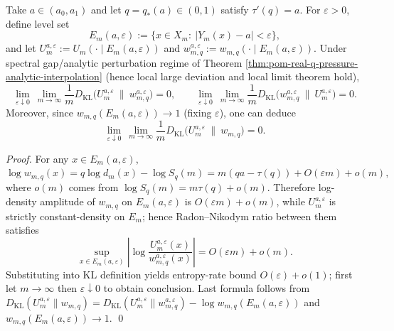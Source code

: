 \begin{theorem}\label{thm:pom-microcanonical-escort-kl-rate-zero}
Take \(a\in(a_0,a_1)\) and let \(q=q_*(a)\in(0,1)\) satisfy \(\tau'(q)=a\).
For \(\varepsilon>0\), define level set
\[
E_m(a,\varepsilon):=\{x\in X_m:\ |Y_m(x)-a|<\varepsilon\},
\]
and let
\(
U_m^{a,\varepsilon}:=U_m(\cdot\mid E_m(a,\varepsilon))
\)
and
\(
w_{m,q}^{a,\varepsilon}:=w_{m,q}(\cdot\mid E_m(a,\varepsilon))
\).
Under spectral gap/analytic perturbation regime of Theorem \ref{thm:pom-real-q-pressure-analytic-interpolation} (hence local large deviation and local limit theorem hold),
\[
\lim_{\varepsilon\downarrow 0}\ \lim_{m\to\infty}\frac{1}{m}D_{\mathrm{KL}}\!\bigl(U_m^{a,\varepsilon}\ \|\ w_{m,q}^{a,\varepsilon}\bigr)=0,
\qquad
\lim_{\varepsilon\downarrow 0}\ \lim_{m\to\infty}\frac{1}{m}D_{\mathrm{KL}}\!\bigl(w_{m,q}^{a,\varepsilon}\ \|\ U_m^{a,\varepsilon}\bigr)=0.
\]
Moreover, since \(w_{m,q}(E_m(a,\varepsilon))\to 1\) (fixing \(\varepsilon\)), one can deduce
\[
\lim_{\varepsilon\downarrow 0}\ \lim_{m\to\infty}\frac{1}{m}D_{\mathrm{KL}}\!\bigl(U_m^{a,\varepsilon}\ \|\ w_{m,q}\bigr)=0.
\]
\end{theorem}
\begin{proof}
For any \(x\in E_m(a,\varepsilon)\),
\(
\log w_{m,q}(x)=q\log d_m(x)-\log S_q(m)
= m(q a-\tau(q))+O(\varepsilon m)+o(m),
\)
where \(o(m)\) comes from \(\log S_q(m)=m\tau(q)+o(m)\).
Therefore log-density amplitude of \(w_{m,q}\) on \(E_m(a,\varepsilon)\) is \(O(\varepsilon m)+o(m)\), while \(U_m^{a,\varepsilon}\) is strictly constant-density on \(E_m\); hence Radon--Nikodym ratio between them satisfies
\[
\sup_{x\in E_m(a,\varepsilon)}\left|\log\frac{U_m^{a,\varepsilon}(x)}{w_{m,q}^{a,\varepsilon}(x)}\right|
=O(\varepsilon m)+o(m).
\]
Substituting into KL definition yields entropy-rate bound \(O(\varepsilon)+o(1)\); first let \(m\to\infty\) then \(\varepsilon\downarrow 0\) to obtain conclusion.
Last formula follows from
\(
D_{\mathrm{KL}}(U_m^{a,\varepsilon}\|w_{m,q})
=D_{\mathrm{KL}}(U_m^{a,\varepsilon}\|w_{m,q}^{a,\varepsilon})-\log w_{m,q}(E_m(a,\varepsilon))
\)
and \(w_{m,q}(E_m(a,\varepsilon))\to 1\). \qed
\end{proof}

